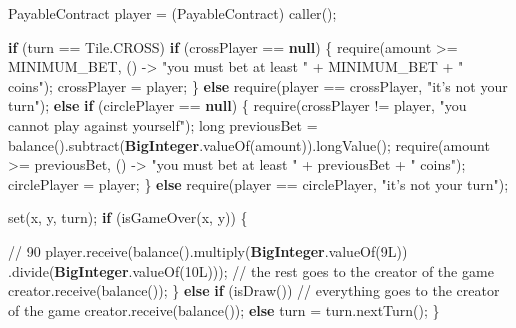 \documentclass[a4paper,]{book}
\newenvironment{Shaded}{\begin{snugshade}}{\end{snugshade}}
\newcommand{\BuiltInTok}[1]{\textcolor[rgb]{0.39,0.29,0.61}{\textbf{#1}}}
\newcommand{\CommentTok}[1]{\textcolor[rgb]{0.54,0.53,0.53}{#1}}
\newcommand{\DataTypeTok}[1]{\textcolor[rgb]{0.00,0.34,0.68}{#1}}
\newcommand{\DecValTok}[1]{\textcolor[rgb]{0.69,0.50,0.00}{#1}}
\newcommand{\FunctionTok}[1]{\textcolor[rgb]{0.39,0.29,0.61}{#1}}
\newcommand{\KeywordTok}[1]{\textcolor[rgb]{0.12,0.11,0.11}{\textbf{#1}}}
\newcommand{\NormalTok}[1]{\textcolor[rgb]{0.12,0.11,0.11}{#1}}
\newcommand{\StringTok}[1]{\textcolor[rgb]{0.75,0.01,0.01}{#1}}
\renewenvironment{Shaded}{\begin{snugshade}\small}{\end{snugshade}}
\begin{document}
{\begin{Shaded}
\begin{Highlighting}[]
\NormalTok{    PayableContract player = (PayableContract) }\FunctionTok{caller}\NormalTok{();}

    \KeywordTok{if}\NormalTok{ (turn == Tile.}\FunctionTok{CROSS}\NormalTok{)}
      \KeywordTok{if}\NormalTok{ (crossPlayer == }\KeywordTok{null}\NormalTok{) \{}
        \FunctionTok{require}\NormalTok{(amount >= MINIMUM_BET,}
\NormalTok{          () -> }\StringTok{"you must bet at least "}\NormalTok{ + MINIMUM_BET + }\StringTok{" coins"}\NormalTok{);}
\NormalTok{        crossPlayer = player;}
\NormalTok{      \}}
      \KeywordTok{else}
        \FunctionTok{require}\NormalTok{(player == crossPlayer, }\StringTok{"it's not your turn"}\NormalTok{);}
    \KeywordTok{else}
      \KeywordTok{if}\NormalTok{ (circlePlayer == }\KeywordTok{null}\NormalTok{) \{}
        \FunctionTok{require}\NormalTok{(crossPlayer != player, }\StringTok{"you cannot play against yourself"}\NormalTok{);}
        \DataTypeTok{long}\NormalTok{ previousBet = }\FunctionTok{balance}\NormalTok{().}\FunctionTok{subtract}\NormalTok{(}\BuiltInTok{BigInteger}\NormalTok{.}\FunctionTok{valueOf}\NormalTok{(amount)).}\FunctionTok{longValue}\NormalTok{();}
        \FunctionTok{require}\NormalTok{(amount >= previousBet,}
\NormalTok{          () -> }\StringTok{"you must bet at least "}\NormalTok{ + previousBet + }\StringTok{" coins"}\NormalTok{);}
\NormalTok{        circlePlayer = player;}
\NormalTok{    \}}
    \KeywordTok{else}
      \FunctionTok{require}\NormalTok{(player == circlePlayer, }\StringTok{"it's not your turn"}\NormalTok{);}

    \FunctionTok{set}\NormalTok{(x, y, turn);}
    \KeywordTok{if}\NormalTok{ (}\FunctionTok{isGameOver}\NormalTok{(x, y)) \{}
      \CommentTok{// 90%
\NormalTok{      player.}\FunctionTok{receive}\NormalTok{(}\FunctionTok{balance}\NormalTok{().}\FunctionTok{multiply}\NormalTok{(}\BuiltInTok{BigInteger}\NormalTok{.}\FunctionTok{valueOf}\NormalTok{(}\DecValTok{9L}\NormalTok{))}
\NormalTok{                              .}\FunctionTok{divide}\NormalTok{(}\BuiltInTok{BigInteger}\NormalTok{.}\FunctionTok{valueOf}\NormalTok{(}\DecValTok{10L}\NormalTok{)));}
      \CommentTok{// the rest goes to the creator of the game}
\NormalTok{      creator.}\FunctionTok{receive}\NormalTok{(}\FunctionTok{balance}\NormalTok{());}
\NormalTok{    \}}
    \KeywordTok{else} \KeywordTok{if}\NormalTok{ (}\FunctionTok{isDraw}\NormalTok{())}
      \CommentTok{// everything goes to the creator of the game}
\NormalTok{      creator.}\FunctionTok{receive}\NormalTok{(}\FunctionTok{balance}\NormalTok{());}
    \KeywordTok{else}
\NormalTok{      turn = turn.}\FunctionTok{nextTurn}\NormalTok{();}
\NormalTok{  \}}

}
\end{Highlighting}
\end{Shaded}}
\end{document}
